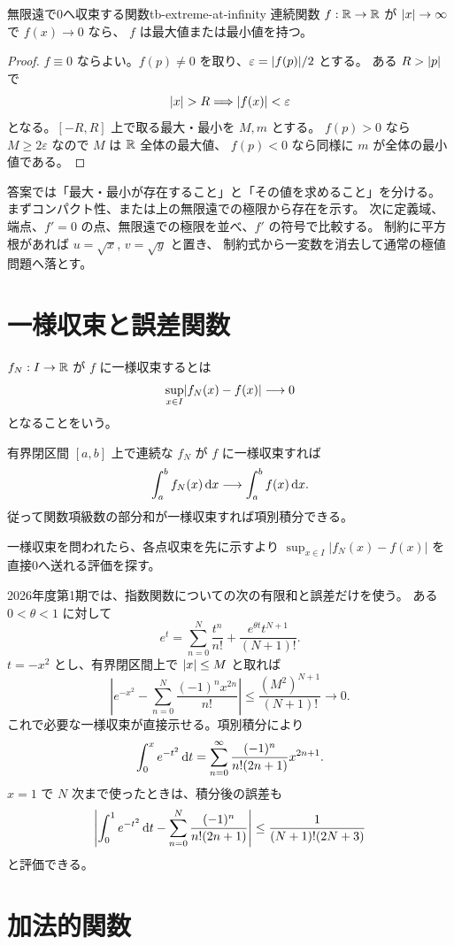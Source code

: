 \begin{proposition}{無限遠で0へ収束する関数}{tb-extreme-at-infinity}
連続関数 $f:\mathbb{R}\to\mathbb{R}$ が $\lvert x \rvert\to\infty$ で $f(x)\to0$ なら、
$f$ は最大値または最小値を持つ。
\end{proposition}

\begin{proof}
$f\equiv0$ ならよい。$f(p)\ne0$ を取り、$\varepsilon=\lvert f(p) \rvert/2$ とする。
ある $R>\lvert p \rvert$ で
\[
\lvert x \rvert>R\Longrightarrow\lvert f(x) \rvert<\varepsilon
\]
となる。$[-R,R]$ 上で取る最大・最小を $M,m$ とする。
$f(p)>0$ なら $M\ge2\varepsilon$ なので $M$ は $\mathbb{R}$ 全体の最大値、
$f(p)<0$ なら同様に $m$ が全体の最小値である。
\end{proof}

答案では「最大・最小が存在すること」と「その値を求めること」を分ける。
まずコンパクト性、または上の無限遠での極限から存在を示す。
次に定義域、端点、$f'=0$ の点、無限遠での極限を並べ、$f'$ の符号で比較する。
制約に平方根があれば $u=\sqrt x$, $v=\sqrt y$ と置き、
制約式から一変数を消去して通常の極値問題へ落とす。

\section{一様収束と誤差関数}

$f_N:I\to\mathbb{R}$ が $f$ に一様収束するとは
\[
\sup_{x\in I}\lvert f_N(x)-f(x) \rvert\longrightarrow0
\]
となることをいう。

有界閉区間 $[a,b]$ 上で連続な $f_N$ が $f$ に一様収束すれば
\[
\int_a^bf_N(x)\,\mathrm{d} x\longrightarrow\int_a^bf(x)\,\mathrm{d} x.
\]
従って関数項級数の部分和が一様収束すれば項別積分できる。

一様収束を問われたら、各点収束を先に示すより
$\sup_{x\in I}|f_N(x)-f(x)|$ を直接0へ送れる評価を探す。

2026年度第1期では、指数関数についての次の有限和と誤差だけを使う。
ある $0<\theta<1$ に対して
\[
e^t=\sum_{n=0}^{N}\frac{t^n}{n!}
+\frac{e^{\theta t}t^{N+1}}{(N+1)!}.
\]
$t=-x^2$ とし、有界閉区間上で $\lvert x \rvert\le M$ と取れば
\[
\left|e^{-x^2}-\sum_{n=0}^{N}\frac{(-1)^nx^{2n}}{n!}\right|
\le\frac{(M^2)^{N+1}}{(N+1)!}\longrightarrow0.
\]
これで必要な一様収束が直接示せる。項別積分により
\[
\int_0^xe^{-t^2}\,\mathrm{d} t
=\sum_{n=0}^{\infty}\frac{(-1)^n}{n!(2n+1)}x^{2n+1}.
\]
$x=1$ で $N$ 次まで使ったときは、積分後の誤差も
\[
\left|\int_0^1e^{-t^2}\,\mathrm{d} t
-\sum_{n=0}^{N}\frac{(-1)^n}{n!(2n+1)}\right|
\le\frac1{(N+1)!(2N+3)}
\]
と評価できる。

\section{加法的関数}


